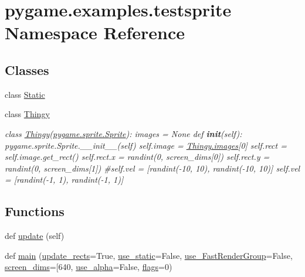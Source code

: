 \hypertarget{namespacepygame_1_1examples_1_1testsprite}{}\section{pygame.\+examples.\+testsprite Namespace Reference}
\label{namespacepygame_1_1examples_1_1testsprite}
\subsection*{Classes}
\begin{DoxyCompactItemize}
\item 
class \hyperlink{classpygame_1_1examples_1_1testsprite_1_1_static}{Static}
\item 
class \hyperlink{classpygame_1_1examples_1_1testsprite_1_1_thingy}{Thingy}
\begin{DoxyCompactList}\small\item\em class \hyperlink{classpygame_1_1examples_1_1testsprite_1_1_thingy}{Thingy}(\hyperlink{classpygame_1_1sprite_1_1_sprite}{pygame.\+sprite.\+Sprite})\+: images = None def {\bfseries init}(self)\+: pygame.\+sprite.\+Sprite.\+\_\+\+\_\+init\+\_\+\+\_\+(self) self.\+image = \hyperlink{classpygame_1_1examples_1_1testsprite_1_1_thingy_afac85d1016fa562327df33eb3162e384}{Thingy.\+images}\mbox{[}0\mbox{]} self.\+rect = self.\+image.\+get\+\_\+rect() self.\+rect.\+x = randint(0, screen\+\_\+dims\mbox{[}0\mbox{]}) self.\+rect.\+y = randint(0, screen\+\_\+dims\mbox{[}1\mbox{]}) \#self.\+vel = \mbox{[}randint(-\/10, 10), randint(-\/10, 10)\mbox{]} self.\+vel = \mbox{[}randint(-\/1, 1), randint(-\/1, 1)\mbox{]} \end{DoxyCompactList}\end{DoxyCompactItemize}
\subsection*{Functions}
\begin{DoxyCompactItemize}
\item 
def \hyperlink{namespacepygame_1_1examples_1_1testsprite_a6167216b82854360e55a0507e54eabe4}{update} (self)
\item 
def \hyperlink{namespacepygame_1_1examples_1_1testsprite_a7e3c7cf8928099e3811f6d57f20c0f43}{main} (\hyperlink{namespacepygame_1_1examples_1_1testsprite_a906a5e04b052b7f10501a74fd4101131}{update\+\_\+rects}=True, \hyperlink{namespacepygame_1_1examples_1_1testsprite_a70337598049fd97cee98739bd33b191c}{use\+\_\+static}=False, \hyperlink{namespacepygame_1_1examples_1_1testsprite_a393ba62891dcfc21f64d4fdd0e136dbb}{use\+\_\+\+Fast\+Render\+Group}=False, \hyperlink{namespacepygame_1_1examples_1_1testsprite_a9876b374b00da448006c729075d3139d}{screen\+\_\+dims}=\mbox{[}640, \hyperlink{namespacepygame_1_1examples_1_1testsprite_afd8c032ad3fc95a2d20aaa32b0f2d496}{use\+\_\+alpha}=False, \hyperlink{namespacepygame_1_1examples_1_1testsprite_a57f2563beaba10d099978d40faf0e508}{flags}=0)
\end{DoxyCompactItemize}
